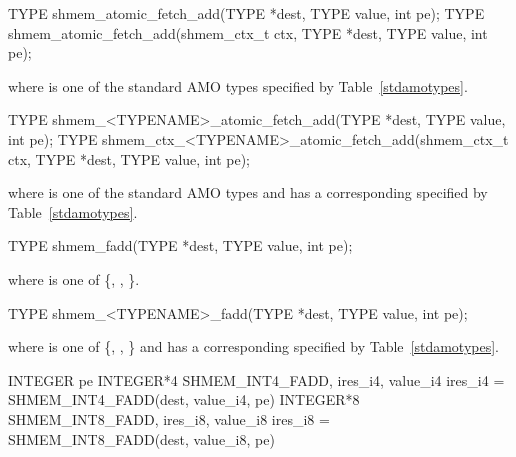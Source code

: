 
\begin{apidefinition}

\begin{C11synopsis}
TYPE shmem_atomic_fetch_add(TYPE *dest, TYPE value, int pe);
TYPE shmem_atomic_fetch_add(shmem_ctx_t ctx, TYPE *dest, TYPE value, int pe);
\end{C11synopsis}
where \TYPE{} is one of the standard \ac{AMO} types specified by
Table~\ref{stdamotypes}.

\begin{Csynopsis}
TYPE shmem_<TYPENAME>_atomic_fetch_add(TYPE *dest, TYPE value, int pe);
TYPE shmem_ctx_<TYPENAME>_atomic_fetch_add(shmem_ctx_t ctx, TYPE *dest, TYPE value, int pe);
\end{Csynopsis}
where \TYPE{} is one of the standard \ac{AMO} types and has a corresponding
\TYPENAME{} specified by Table~\ref{stdamotypes}.

\begin{DeprecateBlock}
\begin{C11synopsis}
TYPE shmem_fadd(TYPE *dest, TYPE value, int pe);
\end{C11synopsis}
where \TYPE{} is one of \{, , \}.

\begin{Csynopsis}
TYPE shmem_<TYPENAME>_fadd(TYPE *dest, TYPE value, int pe);
\end{Csynopsis}
where \TYPE{} is one of \{, , \}
and has a corresponding \TYPENAME{} specified by Table~\ref{stdamotypes}.
\end{DeprecateBlock}

\begin{Fsynopsis}
INTEGER pe
INTEGER*4 SHMEM_INT4_FADD, ires_i4, value_i4
ires_i4 = SHMEM_INT4_FADD(dest, value_i4, pe)
INTEGER*8 SHMEM_INT8_FADD, ires_i8, value_i8
ires_i8 = SHMEM_INT8_FADD(dest, value_i8, pe)
\end{Fsynopsis}

\begin{apiarguments}



\end{apiarguments}
\end{apidefinition}
